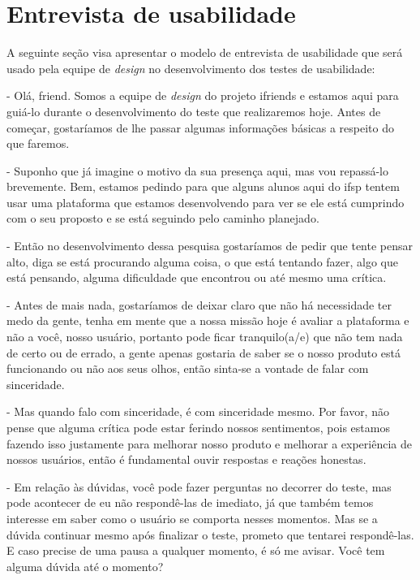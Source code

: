 \chapter{Entrevista de usabilidade}
\label{script_entrevista}

A seguinte seção visa apresentar o modelo de entrevista de usabilidade que será usado pela equipe de \textit{design} no desenvolvimento dos testes de usabilidade:

- Olá, \gls{friend}. Somos a equipe de \textit{design} do projeto \gls{ifriends} e estamos aqui para guiá-lo durante o desenvolvimento do teste que realizaremos hoje. Antes de começar, gostaríamos de lhe passar algumas informações básicas a respeito do que faremos. 

- Suponho que já imagine o motivo da sua presença aqui, mas vou repassá-lo brevemente. Bem, estamos pedindo para que alguns alunos aqui do \acs{ifsp} tentem usar uma plataforma que estamos desenvolvendo para ver se ele está cumprindo com o seu proposto e se está seguindo pelo caminho planejado. 

- Então no desenvolvimento dessa pesquisa gostaríamos de pedir que tente pensar alto, diga se está procurando alguma coisa, o que está tentando fazer, algo que está pensando, alguma dificuldade que encontrou ou até mesmo uma crítica. 

- Antes de mais nada, gostaríamos de deixar claro que não há necessidade ter medo da gente, tenha em mente que a nossa missão hoje é avaliar a plataforma e não a você, nosso usuário, portanto pode ficar tranquilo(a/e) que não tem nada de certo ou de errado, a gente apenas gostaria de saber se o nosso produto está funcionando ou não aos seus olhos, então sinta-se a vontade de falar com sinceridade.

- Mas quando falo com sinceridade, é com sinceridade mesmo. Por favor, não pense que alguma crítica pode estar ferindo nossos sentimentos, pois estamos fazendo isso justamente para melhorar nosso produto e melhorar a experiência de nossos usuários, então é fundamental ouvir respostas e reações honestas. 

- Em relação às dúvidas, você pode fazer perguntas no decorrer do teste, mas pode acontecer de eu não respondê-las de imediato, já que também temos interesse em saber como o usuário se comporta nesses momentos.  Mas se a dúvida continuar mesmo após finalizar o teste, prometo que tentarei respondê-las. E caso precise de uma pausa a qualquer momento, é só me avisar. Você tem alguma dúvida até o momento? 

